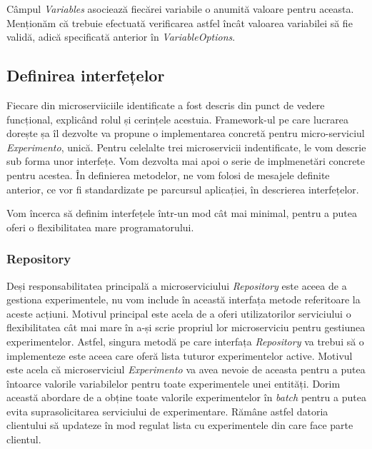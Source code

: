 Câmpul \textit{Variables} asociează fiecărei variabile o anumită valoare pentru aceasta. Menționăm că trebuie efectuată verificarea astfel încât valoarea variabilei să fie validă, adică specificată anterior în \textit{VariableOptions}.


\subsection{Definirea interfețelor}

Fiecare din microserviiciile identificate a fost descris din punct de vedere funcțional, explicând rolul și cerințele acestuia. Framework-ul pe care lucrarea dorește șa îl dezvolte va propune o implementarea concretă pentru micro-serviciul \textit{Experimento}, unică. Pentru celelalte trei microservicii indentificate, le vom descrie sub forma unor interfețe. Vom dezvolta mai apoi o serie de implmenetări concrete pentru acestea. În definierea metodelor, ne vom folosi de mesajele definite anterior, ce vor fi standardizate pe parcursul aplicației, în descrierea interfețelor.

\begin{remark}
	Vom încerca să definim interfețele într-un mod cât mai minimal, pentru a putea oferi o flexibilitatea mare programatorului.
\end{remark}

\subsubsection{Repository}

Deși responsabilitatea principală a microserviciului \textit{Repository} este aceea de a gestiona experimentele, nu vom include în această interfața metode referitoare la aceste acțiuni. Motivul principal este acela de a oferi utilizatorilor serviciului o flexibilitatea cât mai mare în a-și scrie propriul lor microserviciu pentru gestiunea experimentelor. Astfel, singura metodă pe care interfața \textit{Repository} va trebui să o implementeze este aceea care oferă lista tuturor experimentelor active. Motivul este acela că microserviciul \textit{Experimento} va avea nevoie de aceasta pentru a putea întoarce valorile variabilelor pentru toate experimentele unei entități. Dorim această abordare de a obține toate valorile experimentelor în \textit{batch} pentru a putea evita suprasolicitarea serviciului de experimentare. Rămâne astfel datoria clientului să updateze în mod regulat lista cu experimentele din care face parte clientul. 


